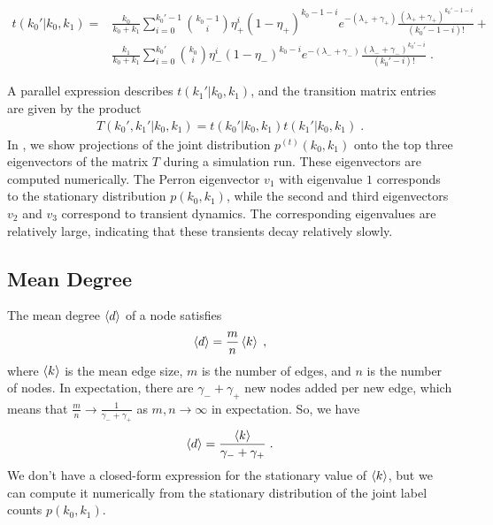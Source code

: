 \documentclass[aps,pre,reprint,superscriptaddress,nofootinbib]{revtex4-2}
\begin{document}
\begin{widetext}
    \begin{align}
        t(k_0' | k_0, k_1) =& \frac{k_0}{k_0 + k_1} \sum_{i=0}^{k_0' - 1} \binom{k_0 - 1}{i} \eta_+^i (1 - \eta_+)^{k_0 - 1 - i} 
        e^{-(\lambda_+ + \gamma_+)} \frac{(\lambda_+ + \gamma_+)^{k_0' - 1 - i}}{(k_0' - 1 - i)!}  + \\ 
        & \frac{k_1}{k_0 + k_1} \sum_{i=0}^{k_0'} \binom{k_0}{i} \eta_-^i (1 - \eta_-)^{k_0 - i} 
        e^{-(\lambda_- + \gamma_-)} \frac{(\lambda_- + \gamma_-)^{k_0' - i}}{(k_0' - i)!}\;.
    \end{align}
\end{widetext}
A parallel expression describes $t(k_1' | k_0, k_1)$, and the transition matrix entries are given by the product 
\begin{align}
    T(k_0', k_1' | k_0, k_1) = t(k_0' | k_0, k_1) t(k_1' | k_0, k_1) \;.
\end{align}
In , we show projections of the joint distribution $p^{(t)}(k_0, k_1)$ onto the top three eigenvectors of the matrix $T$ during a simulation run. 
These eigenvectors are computed numerically. 
The Perron eigenvector $v_1$ with eigenvalue $1$ corresponds to the stationary distribution $p(k_0, k_1)$, while the second and third eigenvectors $v_2$ and $v_3$ correspond to transient dynamics.
The corresponding eigenvalues are relatively large, indicating that these transients decay relatively slowly. 









\subsection{Mean Degree}

The mean degree $\left\langle d \right\rangle$ of a node satisfies 
\begin{align}
    \left\langle d \right\rangle = \frac{m}{n}\left\langle k \right\rangle \;,
\end{align}
where $\left\langle k \right\rangle$ is the mean edge size, $m$ is the number of edges, and $n$ is the number of nodes.
In expectation, there are $\gamma_- + \gamma_+$ new nodes added per new edge, which means that $\frac{m}{n} \to \frac{1}{\gamma_- + \gamma_+}$ as $m, n \to \infty$ in expectation.
So, we have 
\begin{align}
    \left\langle d \right\rangle = \frac{\left\langle k \right\rangle}{\gamma_- + \gamma_+} \;.
\end{align}
We don't have a closed-form expression for the stationary value of $\left\langle k \right\rangle$, but we can compute it numerically from the stationary distribution of the joint label counts $p(k_0, k_1)$. 
\end{document}
